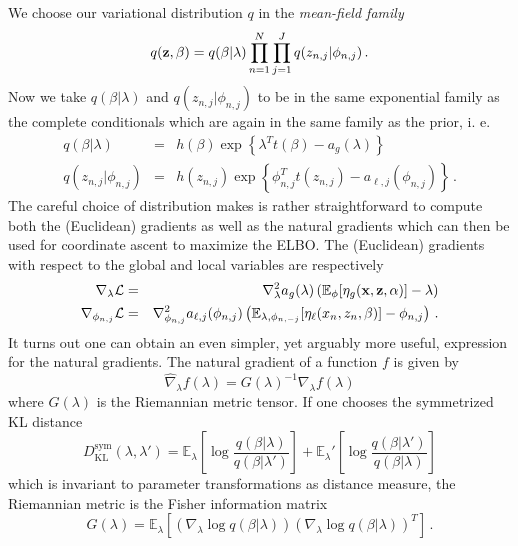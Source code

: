 \documentclass[12pt,abstracton,a4paper]{scrartcl}
\def\x{{\bf x}}
\def\z{{\bf z}}
\begin{document}
We choose our variational distribution $q$ in the \textit{mean-field family}
\begin{equation}
    q({\bf z}, \beta) = q(\beta | \lambda) \prod_{n=1}^N\prod_{j=1}^J
    q(z_{n,j}|\phi_{n,j}) \,. 
\end{equation}
Now we take $q(\beta|\lambda)$ and $q(z_{n,j}|\phi_{n,j})$ to be in the same exponential family as the complete conditionals which are again in the same family as the prior, i. e.
\begin{eqnarray}
    q(\beta|\lambda) &=& h(\beta) \exp\left\{ \lambda^T t(\beta) -
        a_g(\lambda) \right\} \\
    q(z_{n,j}|\phi_{n,j}) &=& h(z_{n,j}) \exp\left\{ \phi_{n,j}^Tt(z_{n,j})
        -a_{\ell,j}(\phi_{n,j}) \right\} \, .
\end{eqnarray}
The careful choice of distribution makes is rather straightforward to compute both the (Euclidean) gradients as well as the natural gradients which can then be used for coordinate ascent to maximize the ELBO. The (Euclidean) gradients with respect to the global and local variables are respectively
\begin{eqnarray}
    \nabla_\lambda \mathcal L &=& \nabla^2_\lambda a_g(\lambda)\left( \mathbb E_\phi[\eta_g(\x,\z,\alpha)] - \lambda \right) \label{eq:glob-grad} \\
    \nabla_{\phi_{n,j}} \mathcal L &=& \nabla^2_{\phi_{n,j}} a_{\ell,j}({\phi_{n,j}})\left( \mathbb E_{\lambda,\phi_{n,-j}}[\eta_\ell(x_n,z_n,\beta)] - \phi_{n,j} \right) \, . \label{eq:loc:grad}
\end{eqnarray}
It turns out one can obtain an even simpler, yet arguably more useful, expression for the natural gradients. The natural gradient of a function $f$ is given by
\begin{equation}
\hat{\nabla}_\lambda f (\lambda) = G(\lambda)^{-1} \nabla_\lambda f(\lambda) \label{eq:nat-grad}
\end{equation}
where $G(\lambda)$ is the Riemannian metric tensor. If one chooses the symmetrized KL distance 
\begin{equation}
D_\textrm{KL}^{\textrm{sym}}(\lambda,\lambda') =
\mathbb{E}_\lambda \left[ \log \frac{q(\beta|\lambda)}{q(\beta|\lambda')}\right] 
+  \mathbb{E}_\lambda' \left[ \log \frac{q(\beta|\lambda')}{q(\beta|\lambda)}\right]
\end{equation}
which is invariant to parameter transformations as distance measure, the Riemannian metric is the Fisher information matrix
\begin{equation}
    G(\lambda)  = \mathbb{E}_\lambda 
    \left[
    (\nabla_\lambda \log q(\beta|\lambda))
    (\nabla_\lambda \log q(\beta|\lambda))^T
    \right] \,.
\end{equation}
\end{document}
